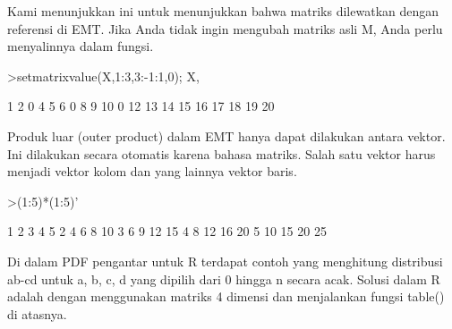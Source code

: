 \documentclass[12pt,arial,letterpaper]{book}
\begin{document}
\begin{eulercomment}
\begin{eulercomment}
\begin{eulercomment}
\begin{eulercomment}
\begin{eulercomment}
\begin{eulercomment}
\begin{eulercomment}
\begin{eulercomment}
\begin{eulercomment}
\begin{eulercomment}
\begin{eulercomment}
\begin{eulercomment}
\begin{eulercomment}
\begin{eulercomment}
\begin{eulercomment}
\begin{eulercomment}
\begin{eulercomment}
\begin{eulercomment}
\begin{eulercomment}
\begin{eulercomment}
\begin{eulercomment}
\begin{eulercomment}
\begin{eulercomment}
\begin{eulercomment}
\begin{eulercomment}
\begin{eulercomment}
\begin{eulercomment}
\begin{eulercomment}
\begin{eulercomment}
\begin{eulercomment}
\begin{eulercomment}
\begin{eulercomment}
\begin{eulercomment}
\begin{eulercomment}
\begin{eulercomment}
\begin{eulercomment}
\begin{eulercomment}
Kami menunjukkan ini untuk menunjukkan bahwa matriks dilewatkan dengan
referensi di EMT. Jika Anda tidak ingin mengubah matriks asli M, Anda
perlu menyalinnya dalam fungsi.
\end{eulercomment}
\begin{eulerprompt}
>setmatrixvalue(X,1:3,3:-1:1,0); X,
\end{eulerprompt}
\begin{euleroutput}
          1         2         0         4         5 
          6         0         8         9        10 
          0        12        13        14        15 
         16        17        18        19        20 
\end{euleroutput}
\begin{eulercomment}
Produk luar (outer product) dalam EMT hanya dapat dilakukan antara
vektor. Ini dilakukan secara otomatis karena bahasa matriks. Salah
satu vektor harus menjadi vektor kolom dan yang lainnya vektor baris.
\end{eulercomment}
\begin{eulerprompt}
>(1:5)*(1:5)'
\end{eulerprompt}
\begin{euleroutput}
          1         2         3         4         5 
          2         4         6         8        10 
          3         6         9        12        15 
          4         8        12        16        20 
          5        10        15        20        25 
\end{euleroutput}
\begin{eulercomment}
Di dalam PDF pengantar untuk R terdapat contoh yang menghitung
distribusi ab-cd untuk a, b, c, d yang dipilih dari 0 hingga n secara
acak. Solusi dalam R adalah dengan menggunakan matriks 4 dimensi dan
menjalankan fungsi table() di atasnya.


\end{eulercomment}
\end{eulercomment}
\end{eulercomment}
\end{eulercomment}
\end{eulercomment}
\end{eulercomment}
\end{eulercomment}
\end{eulercomment}
\end{eulercomment}
\end{eulercomment}
\end{eulercomment}
\end{eulercomment}
\end{eulercomment}
\end{eulercomment}
\end{eulercomment}
\end{eulercomment}
\end{eulercomment}
\end{eulercomment}
\end{eulercomment}
\end{eulercomment}
\end{eulercomment}
\end{eulercomment}
\end{eulercomment}
\end{eulercomment}
\end{eulercomment}
\end{eulercomment}
\end{eulercomment}
\end{eulercomment}
\end{eulercomment}
\end{eulercomment}
\end{eulercomment}
\end{eulercomment}
\end{eulercomment}
\end{eulercomment}
\end{eulercomment}
\end{eulercomment}
\end{eulercomment}
\end{document}
